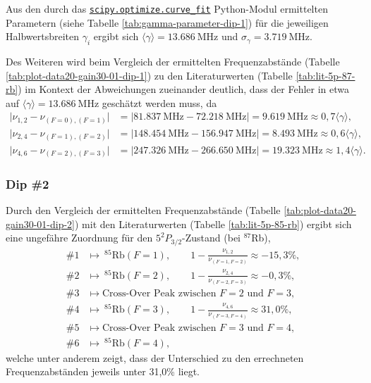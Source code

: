 \noindent Aus den durch das \href{https://docs.scipy.org/doc/scipy/reference/generated/scipy.optimize.curve_fit.html}{\texttt{scipy.optimize.curve_fit}} Python-Modul ermittelten Parametern (siehe Tabelle \ref{tab:gamma-parameter-dip-1}) für die jeweiligen Halbwertsbreiten $\gamma_{i}$ ergibt sich $\langle \gamma \rangle = \SI{13,686}{\mega \hertz}$ und $\sigma_{\gamma} = \SI{3,719}{\mega \hertz}$.

\noindent Des Weiteren wird beim Vergleich der ermittelten Frequenzabstände (Tabelle \ref{tab:plot-data20-gain30-01-dip-1}) zu den Literaturwerten (Tabelle \ref{tab:lit-5p-87-rb}) im Kontext der Abweichungen zueinander deutlich, dass der Fehler in etwa auf $\langle \gamma \rangle = \SI{13,686}{\mega \hertz}$ geschätzt werden muss, da 
\begin{align*}
    \big \vert \nu_{1,2} - \nu_{(F = 0), (F = 1)} \big \vert &= \big \vert \SI{81,837}{\mega \hertz} - \SI{72,218}{\mega \hertz} \big \vert = \SI{9,619}{\mega \hertz} \approx 0,7 \langle \gamma \rangle, \\
    \big \vert \nu_{2,4} - \nu_{(F = 1), (F = 2)} \big \vert &= \big \vert \SI{148,454}{\mega \hertz} - \SI{156,947}{\mega \hertz} \big \vert = \SI{8,493}{\mega \hertz} \approx 0,6 \langle \gamma \rangle, \\
    \big \vert \nu_{4,6} - \nu_{(F = 2), (F = 3)} \big \vert &= \big \vert \SI{247,326}{\mega \hertz} - \SI{266,650}{\mega \hertz} \big \vert = \SI{19,323}{\mega \hertz} \approx 1,4 \langle \gamma \rangle.
\end{align*}

\subsubsection{Dip \textcolor{green!50!black}{\#2}}

\noindent Durch den Vergleich der ermittelten Frequenzabstände (Tabelle \ref{tab:plot-data20-gain30-01-dip-2}) mit den Literaturwerten (Tabelle \ref{tab:lit-5p-85-rb}) ergibt sich eine ungefähre Zuordnung für den $5^{2}P_{3/2}$-Zustand (bei $^{87}$Rb), 
\begin{align*}
    \#1 &\mapsto \ ^{85}\text{Rb}(F = 1), \qquad 1 - \frac{\nu_{1,2}}{\nu_{(F = 1, F = 2)}} \approx -15,3\%, \\
    \#2 &\mapsto \ ^{85}\text{Rb}(F = 2), \qquad 1 - \frac{\nu_{2,4}}{\nu_{(F = 2, F = 3)}} \approx -0,3 \%, \\
    \#3 &\mapsto \text{Cross-Over Peak zwischen $F = 2$ und $F = 3$}, \\
    \#4 &\mapsto \ ^{85}\text{Rb}(F = 3), \qquad 1 - \frac{\nu_{4,6}}{\nu_{(F = 3, F = 4)}} \approx 31,0 \%, \\
    \#5 &\mapsto \text{Cross-Over Peak zwischen $F = 3$ und $F = 4$}, \\
    \#6 &\mapsto \ ^{85}\text{Rb}(F = 4),
\end{align*}
welche unter anderem zeigt, dass der Unterschied zu den errechneten Frequenzabständen jeweils unter 31,0\% liegt. \\

